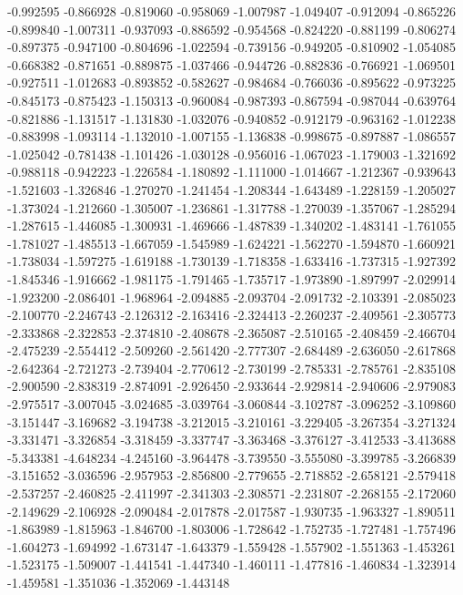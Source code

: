 -0.992595
-0.866928
-0.819060
-0.958069
-1.007987
-1.049407
-0.912094
-0.865226
-0.899840
-1.007311
-0.937093
-0.886592
-0.954568
-0.824220
-0.881199
-0.806274
-0.897375
-0.947100
-0.804696
-1.022594
-0.739156
-0.949205
-0.810902
-1.054085
-0.668382
-0.871651
-0.889875
-1.037466
-0.944726
-0.882836
-0.766921
-1.069501
-0.927511
-1.012683
-0.893852
-0.582627
-0.984684
-0.766036
-0.895622
-0.973225
-0.845173
-0.875423
-1.150313
-0.960084
-0.987393
-0.867594
-0.987044
-0.639764
-0.821886
-1.131517
-1.131830
-1.032076
-0.940852
-0.912179
-0.963162
-1.012238
-0.883998
-1.093114
-1.132010
-1.007155
-1.136838
-0.998675
-0.897887
-1.086557
-1.025042
-0.781438
-1.101426
-1.030128
-0.956016
-1.067023
-1.179003
-1.321692
-0.988118
-0.942223
-1.226584
-1.180892
-1.111000
-1.014667
-1.212367
-0.939643
-1.521603
-1.326846
-1.270270
-1.241454
-1.208344
-1.643489
-1.228159
-1.205027
-1.373024
-1.212660
-1.305007
-1.236861
-1.317788
-1.270039
-1.357067
-1.285294
-1.287615
-1.446085
-1.300931
-1.469666
-1.487839
-1.340202
-1.483141
-1.761055
-1.781027
-1.485513
-1.667059
-1.545989
-1.624221
-1.562270
-1.594870
-1.660921
-1.738034
-1.597275
-1.619188
-1.730139
-1.718358
-1.633416
-1.737315
-1.927392
-1.845346
-1.916662
-1.981175
-1.791465
-1.735717
-1.973890
-1.897997
-2.029914
-1.923200
-2.086401
-1.968964
-2.094885
-2.093704
-2.091732
-2.103391
-2.085023
-2.100770
-2.246743
-2.126312
-2.163416
-2.324413
-2.260237
-2.409561
-2.305773
-2.333868
-2.322853
-2.374810
-2.408678
-2.365087
-2.510165
-2.408459
-2.466704
-2.475239
-2.554412
-2.509260
-2.561420
-2.777307
-2.684489
-2.636050
-2.617868
-2.642364
-2.721273
-2.739404
-2.770612
-2.730199
-2.785331
-2.785761
-2.835108
-2.900590
-2.838319
-2.874091
-2.926450
-2.933644
-2.929814
-2.940606
-2.979083
-2.975517
-3.007045
-3.024685
-3.039764
-3.060844
-3.102787
-3.096252
-3.109860
-3.151447
-3.169682
-3.194738
-3.212015
-3.210161
-3.229405
-3.267354
-3.271324
-3.331471
-3.326854
-3.318459
-3.337747
-3.363468
-3.376127
-3.412533
-3.413688
-5.343381
-4.648234
-4.245160
-3.964478
-3.739550
-3.555080
-3.399785
-3.266839
-3.151652
-3.036596
-2.957953
-2.856800
-2.779655
-2.718852
-2.658121
-2.579418
-2.537257
-2.460825
-2.411997
-2.341303
-2.308571
-2.231807
-2.268155
-2.172060
-2.149629
-2.106928
-2.090484
-2.017878
-2.017587
-1.930735
-1.963327
-1.890511
-1.863989
-1.815963
-1.846700
-1.803006
-1.728642
-1.752735
-1.727481
-1.757496
-1.604273
-1.694992
-1.673147
-1.643379
-1.559428
-1.557902
-1.551363
-1.453261
-1.523175
-1.509007
-1.441541
-1.447340
-1.460111
-1.477816
-1.460834
-1.323914
-1.459581
-1.351036
-1.352069
-1.443148
